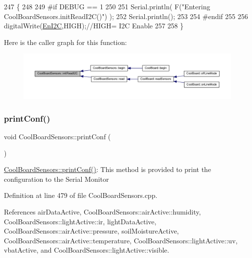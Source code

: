 \begin{DoxyCode}
247 \{
248 
249 \textcolor{preprocessor}{#if DEBUG == 1}
250 
251     Serial.println( F(\textcolor{stringliteral}{"Entering CoolBoardSensors.initReadI2C()"}) );
252     Serial.println();
253 
254 \textcolor{preprocessor}{#endif}
255  
256     digitalWrite(\hyperlink{classCoolBoardSensors_aaa6b5dbf3a6633bffd9d204d961096dc}{EnI2C},HIGH);\textcolor{comment}{//HIGH= I2C Enable}
257 
258 \}
\end{DoxyCode}
Here is the caller graph for this function\+:\nopagebreak
\begin{figure}[H]
\begin{center}
\leavevmode
\includegraphics[width=350pt]{classCoolBoardSensors_acad6a8418c66d36868caca23c844ecb6_icgraph}
\end{center}
\end{figure}
\mbox{\label{classCoolBoardSensors_af6fd79505815b204c178617ecf54c873}} 
\subsubsection{\texorpdfstring{print\+Conf()}{printConf()}}
{\footnotesize\ttfamily void Cool\+Board\+Sensors\+::print\+Conf (\begin{DoxyParamCaption}{ }\end{DoxyParamCaption})}

\hyperlink{classCoolBoardSensors_af6fd79505815b204c178617ecf54c873}{Cool\+Board\+Sensors\+::print\+Conf()}\+: This method is provided to print the configuration to the Serial Monitor 

Definition at line 479 of file Cool\+Board\+Sensors.\+cpp.



References air\+Data\+Active, Cool\+Board\+Sensors\+::air\+Active\+::humidity, Cool\+Board\+Sensors\+::light\+Active\+::ir, light\+Data\+Active, Cool\+Board\+Sensors\+::air\+Active\+::pressure, soil\+Moisture\+Active, Cool\+Board\+Sensors\+::air\+Active\+::temperature, Cool\+Board\+Sensors\+::light\+Active\+::uv, vbat\+Active, and Cool\+Board\+Sensors\+::light\+Active\+::visible.



